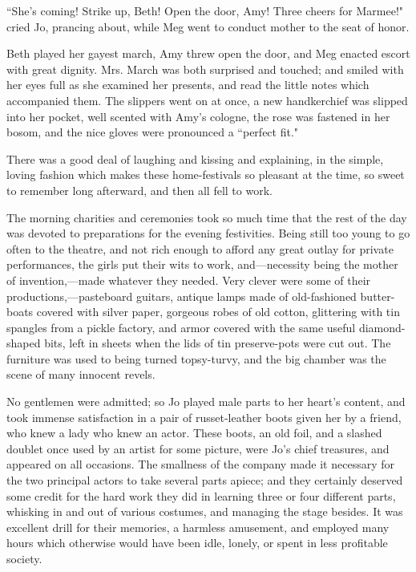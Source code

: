 ``She's coming! Strike up, Beth! Open the door, Amy!
Three cheers for Marmee!" cried Jo, prancing about, while Meg went to
conduct mother to the seat of honor.

Beth played her gayest march, Amy threw open the door, and Meg enacted
escort with great dignity. Mrs. March was both surprised and touched;
and smiled with her eyes full as she examined her presents, and read the
little notes which accompanied them. The slippers went on at once, a new
handkerchief was slipped into her pocket, well scented with
Amy's cologne, the rose was fastened in her bosom, and
the nice gloves were pronounced a ``perfect fit."

There was a good deal of laughing and kissing and explaining, in the
simple, loving fashion which makes these home-festivals so pleasant at
the time, so sweet to remember long afterward, and then all fell to
work.

The morning charities and ceremonies took so much time that the rest of
the day was devoted to preparations for the evening festivities. Being
still too young to go often to the theatre, and not rich enough to
afford any great outlay for private performances, the girls put their
wits to work, and---necessity being the mother of invention,---made
whatever they needed. Very clever were some of their
productions,---pasteboard guitars, antique lamps made of old-fashioned
butter-boats covered with silver paper, gorgeous robes of old cotton,
glittering with tin spangles from a pickle factory, and armor covered
with the same useful diamond-shaped bits, left in sheets when the lids
of tin preserve-pots were cut out. The furniture was used to being
turned topsy-turvy, and the big chamber was the scene of many innocent
revels.

No gentlemen were admitted; so Jo played male parts to her
heart's content, and took immense satisfaction in a pair
of russet-leather boots given her by a friend, who knew a lady who knew
an actor. These boots, an old foil, and a slashed doublet once used by
an artist for some picture, were Jo's chief treasures,
and appeared on all occasions. The smallness of the company made it
necessary for the two principal actors to take several parts apiece; and
they certainly deserved some credit for the hard work they did in
learning three or four different parts, whisking in and out of various
costumes, and managing the stage besides. It was excellent drill for
their memories, a harmless amusement, and employed many hours which
otherwise would have been idle, lonely, or spent in less profitable
society.

